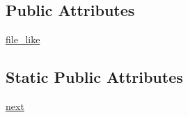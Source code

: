 \subsection*{Public Attributes}
\begin{DoxyCompactItemize}
\item 
\hyperlink{classpip_1_1__vendor_1_1msgpack_1_1fallback_1_1Unpacker_a0688f673a943509486c55d2754c2deed}{file\+\_\+like}
\end{DoxyCompactItemize}
\subsection*{Static Public Attributes}
\begin{DoxyCompactItemize}
\item 
\hyperlink{classpip_1_1__vendor_1_1msgpack_1_1fallback_1_1Unpacker_a02e39e05ca5e5bdb0a65dad59dca5054}{next}
\end{DoxyCompactItemize}


